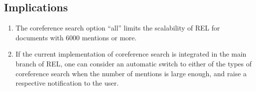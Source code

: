 \documentclass[a4paper,11pt]{article}
\numberwithin{equation}{section} %
\begin{document}
\subsection{Implications}

\begin{enumerate}
 \item The coreference search option ``all'' limits the scalability of REL for documents with 6000 mentions or more.
 \item If the current implementation of coreference search is integrated in the main branch of REL, one can consider an automatic switch to either of the types of coreference search when the number of mentions is large enough, and raise a respective notification to the user. 
\end{enumerate}





\end{document}
